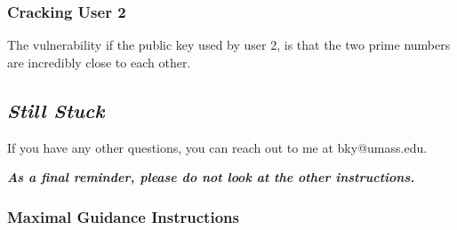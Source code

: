 {                        \subsubsection*{Cracking User 2}



                            The vulnerability if the public key used by user 2, is that the two prime numbers are incredibly close to each other. 



                    \subsection*{\textit{Still Stuck}}



                        If you have any other questions, you can reach out to me at bky@umass.edu. 







                    \textbf{\textit{As a final reminder, please do not look at the other instructions.}}



            }



        \newpage



        \subsubsection{Maximal Guidance Instructions}



